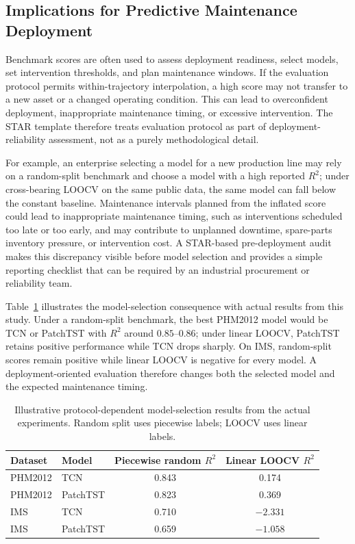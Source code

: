 \documentclass[pdflatex,sn-mathphys-num]{sn-jnl}
\begin{document}
\subsection{Implications for Predictive Maintenance Deployment}
Benchmark scores are often used to assess deployment readiness, select models, set intervention thresholds, and plan maintenance windows. If the evaluation protocol permits within-trajectory interpolation, a high score may not transfer to a new asset or a changed operating condition. This can lead to overconfident deployment, inappropriate maintenance timing, or excessive intervention. The STAR template therefore treats evaluation protocol as part of deployment-reliability assessment, not as a purely methodological detail.

For example, an enterprise selecting a model for a new production line may rely on a random-split benchmark and choose a model with a high reported $R^2$; under cross-bearing LOOCV on the same public data, the same model can fall below the constant baseline. Maintenance intervals planned from the inflated score could lead to inappropriate maintenance timing, such as interventions scheduled too late or too early, and may contribute to unplanned downtime, spare-parts inventory pressure, or intervention cost. A STAR-based pre-deployment audit makes this discrepancy visible before model selection and provides a simple reporting checklist that can be required by an industrial procurement or reliability team.

Table~\ref{tab:deployment_selection} illustrates the model-selection consequence with actual results from this study. Under a random-split benchmark, the best PHM2012 model would be TCN or PatchTST with $R^2$ around $0.85$--$0.86$; under linear LOOCV, PatchTST retains positive performance while TCN drops sharply. On IMS, random-split scores remain positive while linear LOOCV is negative for every model. A deployment-oriented evaluation therefore changes both the selected model and the expected maintenance timing.


\begin{table}[t]
\centering
\caption{Illustrative protocol-dependent model-selection results from the actual experiments. Random split uses piecewise labels; LOOCV uses linear labels.}
\label{tab:deployment_selection}
\small
\begin{tabular}{llcc}
\toprule
Dataset & Model & Piecewise random $R^2$ & Linear LOOCV $R^2$ \\
\midrule
PHM2012 & TCN & 0.843 & 0.174 \\
PHM2012 & PatchTST & 0.823 & 0.369 \\
IMS & TCN & 0.710 & $-2.331$ \\
IMS & PatchTST & 0.659 & $-1.058$ \\
\bottomrule
\end{tabular}
\end{table}
\end{document}
